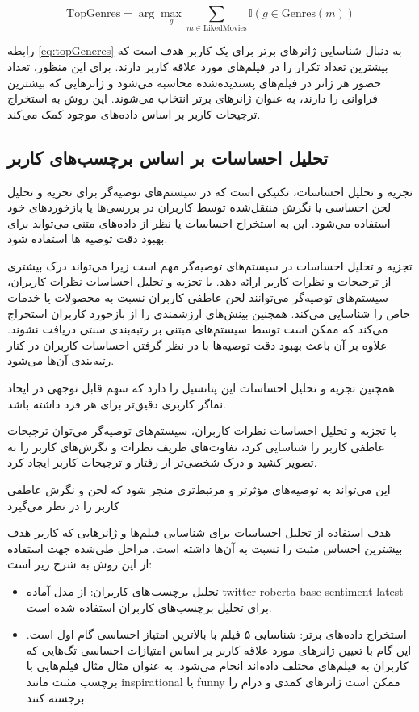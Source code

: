\begin{enumerate}
\begin{LTR}
\begin{equation}
\label{eq:topGeneres}
\text{TopGenres} = \arg\max_{g} \sum_{m \in \text{LikedMovies}} \mathbb{I}(g \in \text{Genres}(m))
\end{equation}
\end{LTR}

رابطه%
\ref{eq:topGeneres} 
 به دنبال شناسایی ژانرهای برتر برای یک کاربر هدف است که بیشترین تعداد تکرار را در فیلم‌های مورد علاقه کاربر دارند. برای این منظور، تعداد حضور هر ژانر در فیلم‌های پسندیده‌شده محاسبه می‌شود و ژانرهایی که بیشترین فراوانی را دارند، به عنوان ژانرهای برتر انتخاب می‌شوند. این روش به استخراج ترجیحات کاربر بر اساس داده‌های موجود کمک می‌کند.


\subsection{تحلیل احساسات بر اساس برچسب‌های کاربر}
تجزیه و تحلیل احساسات، تکنیکی است که در سیستم‌های توصیه‌گر برای تجزیه و تحلیل لحن احساسی یا نگرش منتقل‌شده توسط کاربران در بررسی‌ها یا بازخوردهای خود استفاده می‌شود. این به استخراج احساسات یا نظر از داده‌های متنی می‌تواند برای بهبود دقت توصیه ها استفاده شود.

تجزیه و تحلیل احساسات در سیستم‌های توصیه‌گر مهم است زیرا می‌تواند درک بیشتری از ترجیحات و نظرات کاربر ارائه دهد. با تجزیه و تحلیل احساسات نظرات کاربران، سیستم‌های توصیه‌گر می‌توانند لحن عاطفی کاربران نسبت به محصولات یا خدمات خاص را شناسایی می‌کند. همچنین بینش‌های ارزشمندی را از بازخورد کاربران استخراج می‌کند که ممکن است توسط سیستم‌های مبتنی بر رتبه‌بندی سنتی دریافت نشوند. علاوه بر آن باعث بهبود دقت توصیه‌ها با در نظر گرفتن احساسات کاربران در کنار رتبه‌بندی آن‌ها می‌شود.

همچنین تجزیه و تحلیل احساسات این پتانسیل را دارد که سهم قابل توجهی در ایجاد نماگر کاربری دقیق‌تر برای هر فرد داشته باشد. 

با تجزیه و تحلیل احساسات نظرات کاربران، سیستم‌های توصیه‌گر می‌توان ترجیحات عاطفی کاربر را شناسایی کرد، تفاوت‌های ظریف نظرات و نگرش‌های کاربر را به تصویر کشید و  درک شخصی‌تر از رفتار و ترجیحات کاربر ایجاد کرد.

این می‌تواند به توصیه‌های مؤثرتر و مرتبط‌تری منجر شود که لحن و نگرش عاطفی کاربر را در نظر می‌گیرد
\cite{elahi2023hybrid}


هدف استفاده از تحلیل احساسات برای شناسایی فیلم‌ها و ژانرهایی که کاربر هدف بیشترین احساس مثبت را نسبت به آن‌ها داشته است.
مراحل طی‌شده جهت استفاده از این روش به شرح زیر است:
\begin{itemize}
\item
تحلیل برچسب های کاربران:
از مدل آماده 
\href{https://huggingface.co/cardiffnlp/twitter-roberta-base-sentiment-latest}{twitter-roberta-base-sentiment-latest}
 برای تحلیل برچسب‌های کاربران استفاده شده است.
\item
استخراج داده‌های برتر:
شناسایی ۵ فیلم با بالاترین امتیاز احساسی گام اول است. این گام با تعیین ژانرهای مورد علاقه کاربر بر اساس امتیازات احساسی تگ‌هایی که کاربران به فیلم‌های مختلف داده‌اند انجام می‌شود.
 به عنوان مثال مثال فیلم‌هایی با برچسب مثبت مانند inspirational یا funny ممکن است ژانرهای کمدی و درام را برجسته کنند.



\end{itemize}
\end{enumerate}
